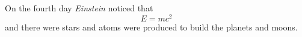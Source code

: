 
On the fourth day \emph{Einstein} noticed that
\[ E=mc^2 \]
and there were stars and atoms were produced to build the planets and moons.
\vfill

